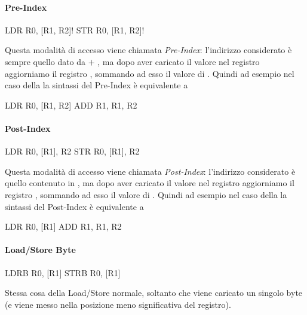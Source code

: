 \paragraph{Pre-Index}
\begin{ARMcode}
    LDR R0, [R1, R2]!
    STR R0, [R1, R2]!
\end{ARMcode}
Questa modalità di accesso viene chiamata \emph{Pre-Index}: l'indirizzo considerato è sempre quello dato da  $+$ , ma dopo aver caricato il valore nel registro  aggiorniamo il registro , sommando ad esso il valore di .
Quindi ad esempio nel caso della  la sintassi del Pre-Index è equivalente a
\begin{ARMcode}
    LDR R0, [R1, R2]
    ADD R1, R1, R2
\end{ARMcode}

\paragraph{Post-Index}
\begin{ARMcode}
    LDR R0, [R1], R2
    STR R0, [R1], R2
\end{ARMcode}
Questa modalità di accesso viene chiamata \emph{Post-Index}: l'indirizzo considerato è quello contenuto in , ma dopo aver caricato il valore nel registro  aggiorniamo il registro , sommando ad esso il valore di .
Quindi ad esempio nel caso della  la sintassi del Post-Index è equivalente a
\begin{ARMcode}
    LDR R0, [R1]
    ADD R1, R1, R2
\end{ARMcode}

\paragraph{Load/Store Byte}
\begin{ARMcode}
    LDRB R0, [R1]
    STRB R0, [R1]
\end{ARMcode}
Stessa cosa della Load/Store normale, soltanto che viene caricato un singolo byte (e viene messo nella posizione meno significativa del registro).

